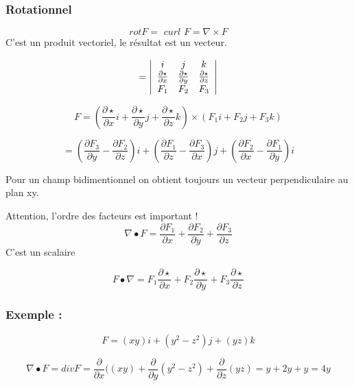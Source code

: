 \subsubsection{Rotationnel}
\begin{mydef}
\[\textit{rot}F = \textit{ curl }F = \nabla \times F\]
C'est un produit vectoriel, le résultat est un vecteur.

\[=
\left|
\begin{array}{c c c}
i&j&k\\
\frac{\partial \star}{\partial x} & \frac{\partial \star}{\partial y} &\frac{\partial \star}{\partial z} \\
F_1& F_2&F_3
\end{array}
\right|
\]


\[\textit{F} = \left( \frac{\partial \star}{\partial x} i +\frac{\partial \star}{\partial y} j +\frac{\partial \star}{\partial z} k \right) \times  (F_1 i +F_2 j +F_3 k) \]

\[=\left( \frac{\partial F_3}{\partial y } -  \frac{\partial F_2}{\partial z }\right) i
+\left( \frac{\partial F_1}{\partial z } -  \frac{\partial F_3}{\partial x }\right) j
+\left( \frac{\partial F_2}{\partial x } -  \frac{\partial F_1}{\partial y }\right) i
\]

Pour un champ bidimentionnel on obtient toujours un vecteur perpendiculaire au plan xy.
\end{mydef}




\begin{myrem}

Attention, l'ordre des facteurs est important !
\[\nabla \bullet F = \frac{\partial F_1}{\partial x}+ \frac{\partial F_2 }{\partial y}+ \frac{\partial F_3 }{\partial z}\] C'est un scalaire

\[F\bullet \nabla = F_1  \frac{\partial \star }{\partial x}+F_2 \frac{\partial \star }{\partial y}+ F_3  \frac{\partial \star }{\partial z}\]

 \end{myrem}

\subsubsection{Exemple :}

\[F=(xy)i+(y^2-z^2)j+(yz)k\]

\[\nabla \bullet F = \textit{div} F = \frac{\partial }{\partial x} ( (xy)+\frac{\partial }{\partial y} (y^2-z^2)+\frac{\partial }{\partial z} (yz) = y+2y+y=4y\]

